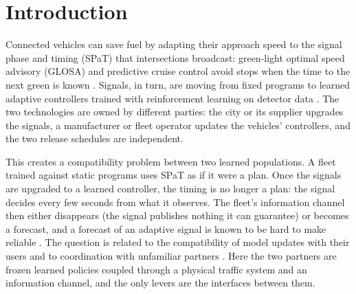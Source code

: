 \documentclass[11pt]{article}
\begin{document}
\section{Introduction}
Connected vehicles can save fuel by adapting their approach speed to the signal phase and timing (SPaT) that intersections broadcast:
green-light optimal speed advisory (GLOSA) and predictive cruise control avoid stops when the time to the next green is known
\cite{katsaros2011,asadi2011}. Signals, in turn, are moving from fixed programs to learned adaptive controllers trained with reinforcement
learning on detector data \cite{wei2018,wei2019,ault2021}. The two technologies are owned by different parties: the city or its supplier
upgrades the signals, a manufacturer or fleet operator updates the vehicles' controllers, and the two release schedules are independent.

This creates a compatibility problem between two learned populations. A fleet trained against static programs uses SPaT as if it were a
plan. Once the signals are upgraded to a learned controller, the timing is no longer a plan: the signal decides every few seconds from what
it observes. The fleet's information channel then either disappears (the signal publishes nothing it can guarantee) or becomes a forecast,
and a forecast of an adaptive signal is known to be hard to make reliable \cite{bodenheimer2014,genser2024,eteifa2025}. The question is
related to the compatibility of model updates with their users \cite{bansal2019} and to coordination with unfamiliar partners
\cite{stone2010,hu2020}. Here the two partners are frozen learned policies coupled through a physical traffic system and an information
channel, and the only levers are the interfaces between them.
\end{document}
